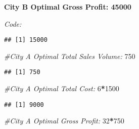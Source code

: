 \documentclass[]{article}
\newenvironment{Shaded}{\begin{snugshade}}{\end{snugshade}}
\newcommand{\CommentTok}[1]{\textcolor[rgb]{0.56,0.35,0.01}{\textit{#1}}}
\newcommand{\DecValTok}[1]{\textcolor[rgb]{0.00,0.00,0.81}{#1}}
\newcommand{\KeywordTok}[1]{\textcolor[rgb]{0.13,0.29,0.53}{\textbf{#1}}}
\newcommand{\NormalTok}[1]{#1}
\newcommand{\OperatorTok}[1]{\textcolor[rgb]{0.81,0.36,0.00}{\textbf{#1}}}
\newcommand{\StringTok}[1]{\textcolor[rgb]{0.31,0.60,0.02}{#1}}
\begin{document}
\textbf{City B Optimal Gross Profit: 45000}

\emph{Code:}

\begin{Shaded}
\end{Shaded}

\begin{verbatim}
## [1] 15000
\end{verbatim}

\begin{Shaded}
\begin{Highlighting}[]
\CommentTok{#City A Optimal Total Sales Volume:}
\DecValTok{750}
\end{Highlighting}
\end{Shaded}

\begin{verbatim}
## [1] 750
\end{verbatim}

\begin{Shaded}
\begin{Highlighting}[]
\CommentTok{#City A Optimal Total Cost:}
\DecValTok{6}\OperatorTok{*}\DecValTok{1500}
\end{Highlighting}
\end{Shaded}

\begin{verbatim}
## [1] 9000
\end{verbatim}

\begin{Shaded}
\begin{Highlighting}[]
\CommentTok{#City A Optimal Gross Profit:}
\DecValTok{32}\OperatorTok{*}\DecValTok{750}
\end{Highlighting}
\end{Shaded}
\end{document}
